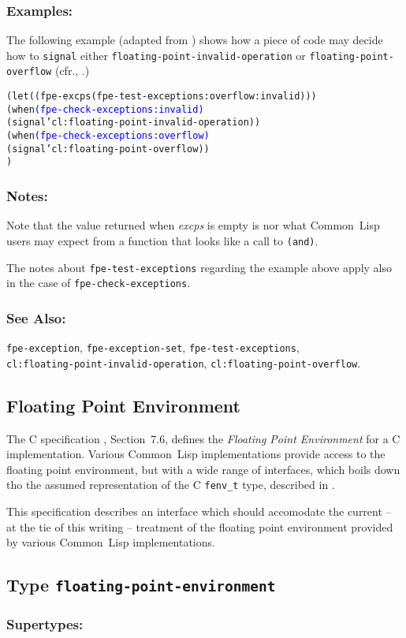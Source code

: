 \documentclass[10pt,fleqn]{article}
\newcommand{\CL}{\textsf{Common~Lisp}}
\newcommand{\CLang}{\textsf{C}}
\newcommand{\code}[1]{\texttt{#1}}
\newcommand{\varname}[1]{\textit{#1}}
\newcommand{\DDictionaryItem}[1]{\vspace*{6pt}\noindent\hrulefill\vspace*{-9pt}\subsection*{#1}}
\newcommand{\DSupertypes}{\subsubsection*{Supertypes:}}
\newcommand{\DExamples}{\subsubsection*{Examples:}}
\newcommand{\DNotes}{\subsubsection*{Notes:}}
\newcommand{\DSeeAlso}{\subsubsection*{See Also:}}
\begin{document}
\DExamples{}

The following example (adapted from \cite{C18}) shows how a piece of
code may decide how to \code{signal} either
\code{floating-point-invalid-operation} or
\code{floating-point-overflow} (cfr., \cite{ANSIHyperSpec}.)

\begin{alltt}
(let ((fpe-excps (fpe-test-exceptions :overflow :invalid)))
   (when \textcolor{blue}{(fpe-check-exceptions :invalid)}
     (signal 'cl:floating-point-invalid-operation))
   (when \textcolor{blue}{(fpe-check-exceptions :overflow)}
     (signal 'cl:floating-point-overflow))
   )
\end{alltt}

\DNotes{}

Note that the value returned when \varname{excps} is empty is nor what
\CL{} users may expect from a function that looks like a call to
\code{(and)}.

The notes about \code{fpe-test-exceptions} regarding the example above
apply also in the case of \code{fpe-check-exceptions}.



\DSeeAlso{}

\code{fpe-exception}, \code{fpe-exception-set},
\code{fpe-test-exceptions},\\
\code{cl:floating-point-invalid-operation},
\code{cl:floating-point-overflow}.








\subsection{Floating Point Environment}

The \CLang{} specification \cite{C18}, Section~7.6, defines the \emph{Floating
  Point Environment} for a \CLang{} implementation.  Various \CL{}
implementations provide access to the floating point environment, but
with a wide range of interfaces, which boils down tho the assumed
representation of the \CLang{} \code{fenv\_t} type, described in
\cite{C18}.

This specification describes an interface which should accomodate the
current -- at the tie of this writing -- treatment of the floating
point environment provided by various \CL{} implementations.


\DDictionaryItem{Type \code{floating-point-environment}}

\DSupertypes{}
\end{document}
